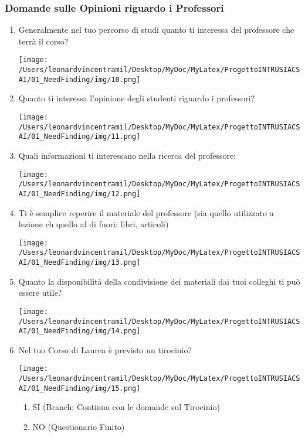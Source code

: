 \subsubsection{Domande sulle Opinioni riguardo i Professori}
\begin{enumerate}
    \item Generalmente nel tuo percorso di studi quanto ti interessa del professore che terrà il corso?
    \begin{center}
        \texttt{[image: /Users/leonardvincentramil/Desktop/MyDoc/MyLatex/ProgettoINTRUSIACSAI/01\_NeedFinding/img/10.png]}
    \end{center}     

    \item Quanto ti interessa l'opinione degli studenti riguardo i professori?
    \begin{center}
        \texttt{[image: /Users/leonardvincentramil/Desktop/MyDoc/MyLatex/ProgettoINTRUSIACSAI/01\_NeedFinding/img/11.png]}
    \end{center} 
    \item Quali informazioni ti interessano nella ricerca del professore:
    \begin{center}
        \texttt{[image: /Users/leonardvincentramil/Desktop/MyDoc/MyLatex/ProgettoINTRUSIACSAI/01\_NeedFinding/img/12.png]}
    \end{center}
    \item Ti è semplice reperire il materiale del professore (sia quello utilizzato a lezione ch quello al di fuori: libri, articoli)
    \begin{center}
        \texttt{[image: /Users/leonardvincentramil/Desktop/MyDoc/MyLatex/ProgettoINTRUSIACSAI/01\_NeedFinding/img/13.png]}
    \end{center} 
    \item Quanto la disponibilità della condivisione dei materiali dai tuoi colleghi ti può essere utile?
    \begin{center}
        \texttt{[image: /Users/leonardvincentramil/Desktop/MyDoc/MyLatex/ProgettoINTRUSIACSAI/01\_NeedFinding/img/14.png]}
    \end{center} 
    \item Nel tuo Corso di Laurea è previsto un tirocinio?
    \begin{center}
        \texttt{[image: /Users/leonardvincentramil/Desktop/MyDoc/MyLatex/ProgettoINTRUSIACSAI/01\_NeedFinding/img/15.png]}
    \end{center} 
    \begin{enumerate}
        \item SI (Branch: Continua con le domande sul Tirocinio)
        \item NO (Questionario Finito)
    \end{enumerate}
\end{enumerate}

